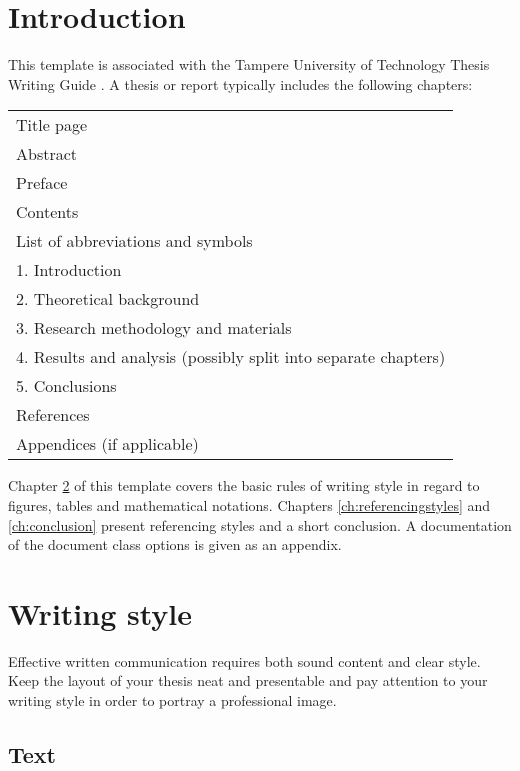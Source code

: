 \documentclass[twoside,draftfooter]{tutthesis} %
\begin{document}

\chapter{Introduction}
\label{ch:Introduction}

This template is associated with the Tampere University of Technology Thesis Writing Guide \citep{Tut2017}.
A thesis or report typically includes the following chapters:

\begin{tabular}[h]{l}
Title page\\
Abstract\\

Preface\\
Contents\\
List of abbreviations and symbols\\
1. Introduction\\
2. Theoretical background\\
3. Research methodology and materials\\
4. Results and analysis (possibly split into separate chapters) \\
5. Conclusions\\
References\\
Appendices (if applicable)
\end{tabular}

Chapter \ref{ch:writingstyle} of this template covers the basic rules of writing style in regard to figures, tables and mathematical notations.
Chapters \ref{ch:referencingstyles} and \ref{ch:conclusion} present referencing styles and a short conclusion.
A documentation of the document class options is given as an appendix.



\chapter{Writing style}
\label{ch:writingstyle}

Effective written communication requires both sound content and clear style.
Keep the layout of your thesis neat and presentable and pay attention to your writing style in order to portray a professional image. 

\section{Text}
\end{document}
